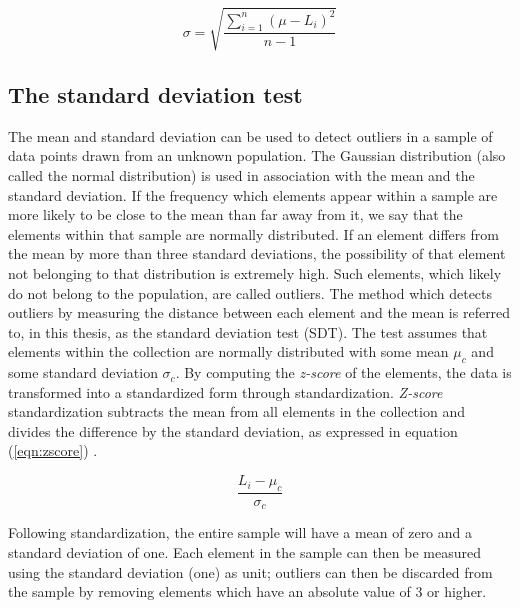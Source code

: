\begin{equation}
\label{eqn:std}
 \sigma = \sqrt{\frac{\sum_{i = 1}^{n} (\mu - L_i)^2}{n-1}}
\end{equation}


\subsection{The standard deviation test}
The mean and standard deviation can be used to detect outliers in a sample of data points drawn from an unknown population. The Gaussian distribution (also called the normal distribution) is used in association with the mean and the standard deviation. If the frequency which elements appear within a sample are more likely to be close to the mean than far away from it, we say that the elements within that sample are normally distributed. If an element differs from the mean by more than three standard deviations, the possibility of that element not belonging to that distribution is extremely high. Such elements, which likely do not belong to the population, are called outliers. The method which detects outliers by measuring the distance between each element and the mean is referred to, in this thesis, as the standard deviation test (SDT). The test assumes that elements within the collection are normally distributed with some mean $\mu_c$ and some standard deviation $\sigma_c$. By computing the \textit{z-score} of the elements, the data is transformed into a standardized form through standardization. \textit{Z-score} standardization subtracts the mean from all elements in the collection and divides the difference by the standard deviation, as expressed in equation (\ref{eqn:zscore}) \cite{geary1935ratio}.

\begin{equation}
\label{eqn:zscore}
 \frac{L_i - \mu_c} {\sigma_c}
\end{equation}

Following standardization, the entire sample will have a mean of zero and a standard deviation of one. Each element in the sample can then be measured using the standard deviation (one) as unit; outliers can then be discarded from the sample by removing elements which have an absolute value of 3 or higher.


